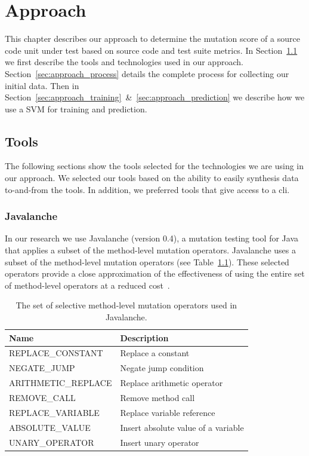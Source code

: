 \chapter{Approach}
\label{chap:approach}
This chapter describes our approach to determine the mutation score of a source code unit under test based on source code and test suite metrics. In Section~\ref{sec:approach_tools} we first describe the tools and technologies used in our approach. Section~\ref{sec:approach_process} details the complete process for collecting our initial data. Then in Section~\ref{sec:approach_training}~\&~\ref{sec:approach_prediction} we describe how we use a SVM for training and prediction.


\section{Tools}
\label{sec:approach_tools}
The following sections show the tools selected for the technologies we are using in our approach. We selected our tools based on the ability to easily synthesis data to-and-from the tools. In addition, we preferred tools that give access to a \gls{cli}.


\subsection{Javalanche}
\label{subsec:approach_javalanche}
In our research we use Javalanche (version 0.4), a mutation testing tool for Java~\cite{SZ09} that applies a subset of the method-level mutation operators. Javalanche uses a subset of the method-level mutation operators (see Table~\ref{tab:javalanche_operators}). These selected operators provide a close approximation of the effectiveness of using the entire set of method-level operators at a reduced cost~\cite{OLR+96}.

\begin{table}[h]
  \centering
  \begin{tabular}{|l|l|}
    \hline
    \rowcolor[RGB]{169,196,223}
    \textbf{Name} & \textbf{Description} \\
    \hline REPLACE\_CONSTANT & Replace a constant \\
    \hline NEGATE\_JUMP & Negate jump condition \\
    \hline ARITHMETIC\_REPLACE & Replace arithmetic operator \\
    \hline REMOVE\_CALL & Remove method call \\
    \hline REPLACE\_VARIABLE & Replace variable reference\\
    \hline ABSOLUTE\_VALUE & Insert absolute value of a variable \\
    \hline UNARY\_OPERATOR & Insert unary operator \\
    \hline
  \end{tabular}
  \caption{The set of selective method-level mutation operators used in Javalanche.}
  \label{tab:javalanche_operators}
\end{table}

